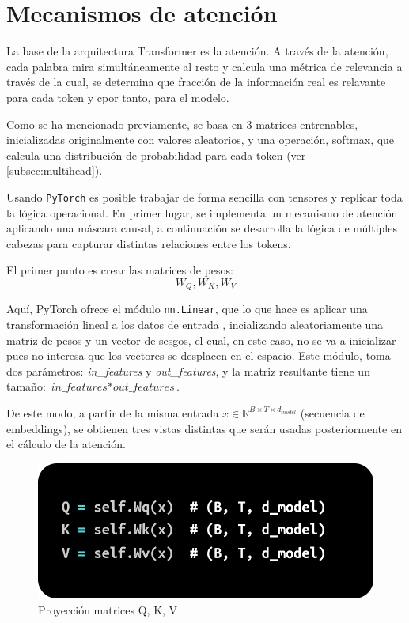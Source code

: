 \documentclass[11pt]{book}
\begin{document}
\section{Mecanismos de atención}
La base de la arquitectura Transformer es la atención. A través de la atención, cada palabra mira simultáneamente al resto y calcula una métrica de relevancia a través de la cual, se determina que fracción de la información real es relavante para cada token y cpor tanto, para el modelo. 

Como se ha mencionado previamente, se basa en 3 matrices entrenables, inicializadas originalmente con valores aleatorios, y una operación, softmax, que calcula una distribución de probabilidad para cada token (ver \cref{subsec:multihead}).

Usando \texttt{PyTorch} es posible trabajar de forma sencilla con tensores y replicar toda la lógica operacional. En primer lugar, se implementa un mecanismo de atención aplicando una máscara causal, a continuación se desarrolla la lógica de múltiples cabezas para capturar distintas relaciones entre los tokens.

El primer punto es crear las matrices de pesos: 
\[W_Q, W_K, W_V\]

Aquí, PyTorch ofrece el módulo \texttt{nn.Linear}, que lo que hace es aplicar una transformación lineal a los datos de entrada \parencite{kanaries_nnlinear}, incializando aleatoriamente una matriz de pesos y un vector de sesgos, el cual, en este caso, no se va a inicializar pues no interesa que los vectores se desplacen en el espacio. Este módulo, toma dos parámetros: \textit{in\_features} y \textit{out\_features}, y la matriz resultante tiene un tamaño: $\textit{in\_features} * \textit{out\_features}$.

De este modo, a partir de la misma entrada $x \in \mathbb{R}^{B \times T \times d_{model}}$ (secuencia de embeddings), se obtienen tres vistas distintas que serán usadas posteriormente en el cálculo de la atención.

\begin{figure}[h]
    \centering
    \includegraphics[width=0.5\linewidth]{img/Q_K_V.png}
    \caption{Proyección matrices Q, K, V}
    \label{fig:Proyeccion8}
\end{figure}
\end{document}
